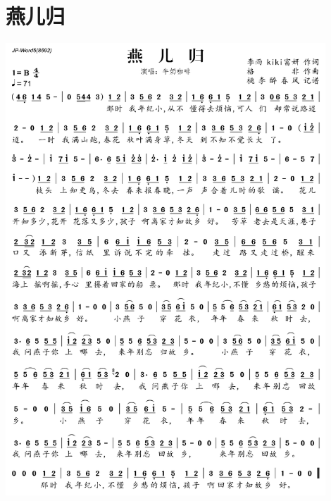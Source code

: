 \documentclass[cn,pad,twocol]{elegantbook}
\begin{document}
\section{燕儿归} \includegraphics[width=0.9\textwidth]{macos/2020燕儿归.png}
\end{document}
